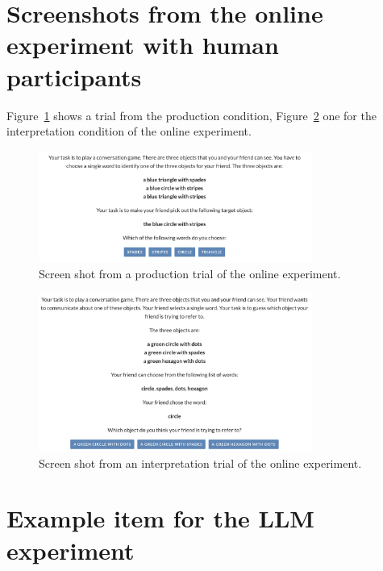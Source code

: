\documentclass[fleqn]{article}
\begin{document}
\newpage
\appendix


\section{Screenshots from the online experiment with human participants}
\label{sec:scre-from-online}

Figure~\ref{fig:refgame-screenshot-production} shows a trial from the production condition, Figure~\ref{fig:refgame-screenshot-interpretation} one for the interpretation condition of the online experiment.

\begin{figure}[H]
  \centering
  \includegraphics[width = 0.8\textwidth]{00-pics/refgame-production.png}

  \caption{Screen shot from a production trial of the online experiment.}
  \label{fig:refgame-screenshot-production}
\end{figure}

\begin{figure}[H]
  \centering
  \includegraphics[width = 0.8\textwidth]{00-pics/refgame-interpretation.png}

  \caption{Screen shot from an interpretation trial of the online experiment.}
  \label{fig:refgame-screenshot-interpretation}
\end{figure}

\section{Example item for the LLM experiment}
\label{sec:examples-items-llm}
\end{document}
